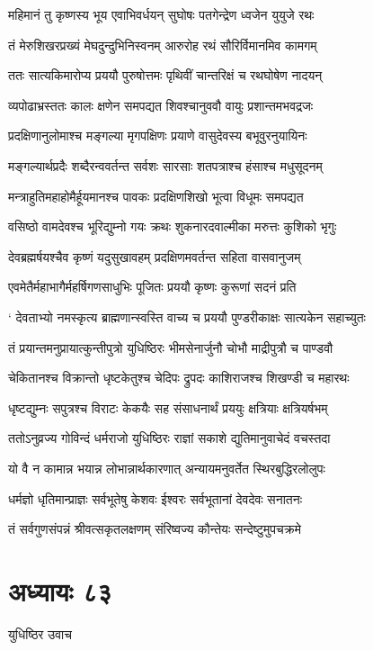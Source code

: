 \twolineshloka
{महिमानं तु कृष्णस्य भूय एवाभिवर्धयन्}
{सुघोषः पतगेन्द्रेण ध्वजेन युयुजे रथः}


\twolineshloka
{तं मेरुशिखरप्रख्यं मेघदुन्दुभिनिस्वनम्}
{आरुरोह रथं सौरिर्विमानमिव कामगम्}


\twolineshloka
{ततः सात्यकिमारोप्य प्रययौ पुरुषोत्तमः}
{पृथिवीं चान्तरिक्षं च रथघोषेण नादयन्}


\twolineshloka
{व्यपोढाभ्रस्ततः कालः क्षणेन समपद्यत}
{शिवश्चानुववौ वायुः प्रशान्तमभवद्रजः}


\twolineshloka
{प्रदक्षिणानुलोमाश्च मङ्गल्या मृगपक्षिणः}
{प्रयाणे वासुदेवस्य बभूवुरनुयायिनः}


\twolineshloka
{मङ्गल्यार्थप्रदैः शब्दैरन्ववर्तन्त सर्वशः}
{सारसाः शतपत्राश्च हंसाश्च मधुसूदनम्}


\twolineshloka
{मन्त्राहुतिमहाहोमैर्हूयमानश्च पावकः}
{प्रदक्षिणशिखो भूत्वा विधूमः समपद्यत}


\twolineshloka
{वसिष्ठो वामदेवश्च भूरिद्युम्नो गयः क्रथः}
{शुकनारदवाल्मीका मरुत्तः कुशिको भृगुः}


\twolineshloka
{देवब्रह्मर्षयश्चैव कृष्णं यदुसुखावहम्}
{प्रदक्षिणमवर्तन्त सहिता वासवानुजम्}


\twolineshloka
{एवमेतैर्महाभागैर्महर्षिगणसाधुभिः}
{पूजितः प्रययौ कृष्णः कुरूणां सदनं प्रति}


\twolineshloka
{` देवताभ्यो नमस्कृत्य ब्राह्मणान्स्वस्ति वाच्य च}
{प्रययौ पुण्डरीकाक्षः सात्यकेन सहाच्युतः}


\twolineshloka
{तं प्रयान्तमनुप्रायात्कुन्तीपुत्रो युधिष्ठिरः}
{भीमसेनार्जुनौ चोभौ माद्रीपुत्रौ च पाण्डवौ}


\twolineshloka
{चेकितानश्च विक्रान्तो धृष्टकेतुश्च चेदिपः}
{द्रुपदः काशिराजश्च शिखण्डी च महारथः}


\twolineshloka
{धृष्टद्युम्नः सपुत्रश्च विराटः केकयैः सह}
{संसाधनार्थं प्रययुः क्षत्रियाः क्षत्रियर्षभम्}


\twolineshloka
{ततोऽनुव्रज्य गोविन्दं धर्मराजो युधिष्ठिरः}
{राज्ञां सकाशे द्युतिमानुवाचेदं वचस्तदा}


\twolineshloka
{यो वै न कामान्न भयान्न लोभान्नार्थकारणात्}
{अन्यायमनुवर्तेत स्थिरबुद्धिरलोलुपः}


\twolineshloka
{धर्मज्ञो धृतिमान्प्राज्ञः सर्वभूतेषु केशवः}
{ईश्वरः सर्वभूतानां देवदेवः सनातनः}


\twolineshloka
{तं सर्वगुणसंपन्नं श्रीवत्सकृतलक्षणम्}
{संरिष्वज्य कौन्तेयः सन्देष्टुमुपचक्रमे}


\chapter{अध्यायः ८३}
\twolineshloka
{युधिष्ठिर उवाच}
{}


